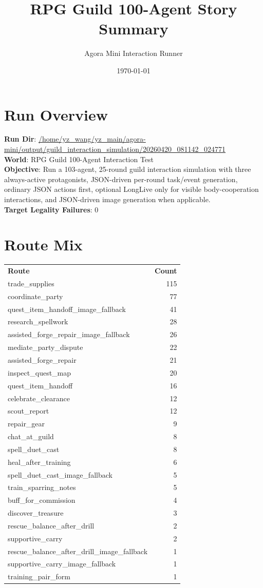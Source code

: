 \documentclass[11pt,a4paper]{article}
\title{RPG Guild 100-Agent Story Summary}
\author{Agora Mini Interaction Runner}
\date{\today}
\begin{document}
\maketitle
\tableofcontents

\section{Run Overview}
\textbf{Run Dir}: \url{/home/yz\_wang/yz\_main/agora-mini/output/guild\_interaction\_simulation/20260420\_081142\_024771}\\
\textbf{World}: RPG Guild 100-Agent Interaction Test\\
\textbf{Objective}: Run a 103-agent, 25-round guild interaction simulation with three always-active protagonists, JSON-driven per-round task/event generation, ordinary JSON actions first, optional LongLive only for visible body-cooperation interactions, and JSON-driven image generation when applicable.\\
\textbf{Target Legality Failures}: 0\\

\section{Route Mix}
\begin{longtable}{lr}
\textbf{Route} & \textbf{Count}\\
trade\_supplies & 115 \\
coordinate\_party & 77 \\
quest\_item\_handoff\_image\_fallback & 41 \\
research\_spellwork & 28 \\
assisted\_forge\_repair\_image\_fallback & 26 \\
mediate\_party\_dispute & 22 \\
assisted\_forge\_repair & 21 \\
inspect\_quest\_map & 20 \\
quest\_item\_handoff & 16 \\
celebrate\_clearance & 12 \\
scout\_report & 12 \\
repair\_gear & 9 \\
chat\_at\_guild & 8 \\
spell\_duet\_cast & 8 \\
heal\_after\_training & 6 \\
spell\_duet\_cast\_image\_fallback & 5 \\
train\_sparring\_notes & 5 \\
buff\_for\_commission & 4 \\
discover\_treasure & 3 \\
rescue\_balance\_after\_drill & 2 \\
supportive\_carry & 2 \\
rescue\_balance\_after\_drill\_image\_fallback & 1 \\
supportive\_carry\_image\_fallback & 1 \\
training\_pair\_form & 1 \\
\end{longtable}
\end{document}
